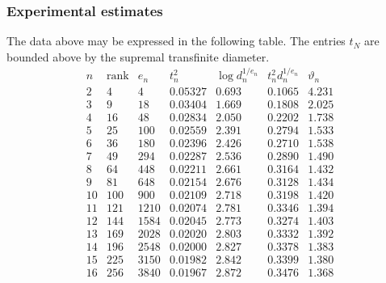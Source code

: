 \documentclass[a4paper,10pt]{amsart}
\theoremstyle{definition}
\theoremstyle{remark}
\numberwithin{equation}{section}
\newcommand{\0}{\color{blue}{\mathsf{0}}}
\begin{document}
    \subsubsection{Experimental estimates}
The  data above may be expressed in the following table. The entries $t_N$  are bounded above by the  supremal transfinite diameter.
\[
\begin{array}{c|cccccc}
 n  &  \mathrm{rank}&  e_n   & t^2_n & \log d^{1/e_n}_n   &  t^2_n d_n^{1/e_n}  & \vartheta_n  \\ \hline
2   & 4 &  4  &  0.05327 & 0.693   &   0.1065  & 4.231  \\
 3 & 9& 18  &  0.03404 & 1.669   &  0.1808 & 2.025 \\
 4 & 16 & 48  &  0.02834 &  2.050  &  0.2202 &  1.738 \\
 5 & 25 &100  & 0.02559  &  2.391 &  0.2794  &  1.533 \\
 6 & 36 & 180  & 0.02396   & 2.426 &   0.2710  &   1.538 \\
 7 & 49 & 294  &  0.02287  &2.536  & 0.2890    &  1.490  \\
 8 & 64 & 448  & 0.02211  &2.661 &   0.3164  &     1.432 \\
 9 &  81 & 648 &   0.02154 & 2.676 &  0.3128 &    1.434 \\ 
 10 & 100 & 900  & 0.02109  & 2.718  &  0.3198   &  1.420  \\ 
 11 &121 & 1210 & 0.02074         & 2.781 &    0.3346 & 1.394   \\
 12 &144 &  1584 & 0.02045        &  2.773 &    0.3274  & 1.403 \\
 13 &169&  2028 & 0.02020        & 2.803  &   0.3332    &  1.392  \\
 14 &196&  2548 & 0.02000 & 2.827 & 0.3378    &  1.383  \\
 15 &225& 3150 & 0.01982  & 2.842 & 0.3399   &  1.380 \\
 16 &256 &  3840 & 0.01967     & 2.872  & 0.3476   &  1.368
 \end{array}
\]
\end{document}

